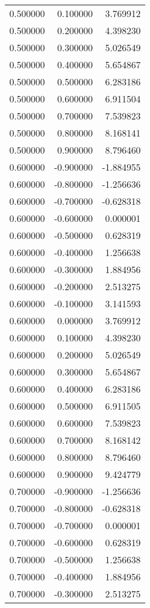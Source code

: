 \begin{tabular}{rrr}
0.500000 & 0.100000 & 3.769912 \\
0.500000 & 0.200000 & 4.398230 \\
0.500000 & 0.300000 & 5.026549 \\
0.500000 & 0.400000 & 5.654867 \\
0.500000 & 0.500000 & 6.283186 \\
0.500000 & 0.600000 & 6.911504 \\
0.500000 & 0.700000 & 7.539823 \\
0.500000 & 0.800000 & 8.168141 \\
0.500000 & 0.900000 & 8.796460 \\
0.600000 & -0.900000 & -1.884955 \\
0.600000 & -0.800000 & -1.256636 \\
0.600000 & -0.700000 & -0.628318 \\
0.600000 & -0.600000 & 0.000001 \\
0.600000 & -0.500000 & 0.628319 \\
0.600000 & -0.400000 & 1.256638 \\
0.600000 & -0.300000 & 1.884956 \\
0.600000 & -0.200000 & 2.513275 \\
0.600000 & -0.100000 & 3.141593 \\
0.600000 & 0.000000 & 3.769912 \\
0.600000 & 0.100000 & 4.398230 \\
0.600000 & 0.200000 & 5.026549 \\
0.600000 & 0.300000 & 5.654867 \\
0.600000 & 0.400000 & 6.283186 \\
0.600000 & 0.500000 & 6.911505 \\
0.600000 & 0.600000 & 7.539823 \\
0.600000 & 0.700000 & 8.168142 \\
0.600000 & 0.800000 & 8.796460 \\
0.600000 & 0.900000 & 9.424779 \\
0.700000 & -0.900000 & -1.256636 \\
0.700000 & -0.800000 & -0.628318 \\
0.700000 & -0.700000 & 0.000001 \\
0.700000 & -0.600000 & 0.628319 \\
0.700000 & -0.500000 & 1.256638 \\
0.700000 & -0.400000 & 1.884956 \\
0.700000 & -0.300000 & 2.513275 \\

\end{tabular}
